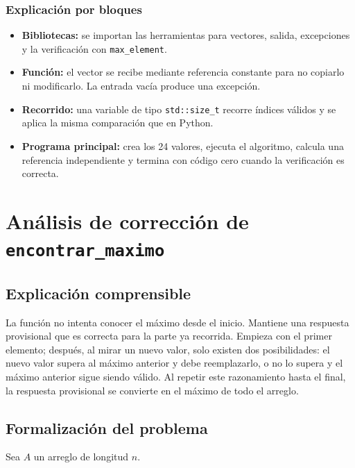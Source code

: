 \documentclass[12pt,letterpaper]{article}
\newcommand{\codigo}[1]{\texttt{#1}}
\begin{document}


\subsubsection{Explicación por bloques}

\begin{itemize}
  \item \textbf{Bibliotecas:} se importan las herramientas para vectores, salida, excepciones y la verificación con \codigo{max\_element}.
  \item \textbf{Función:} el vector se recibe mediante referencia constante para no copiarlo ni modificarlo. La entrada vacía produce una excepción.
  \item \textbf{Recorrido:} una variable de tipo \codigo{std::size\_t} recorre índices válidos y se aplica la misma comparación que en Python.
  \item \textbf{Programa principal:} crea los 24 valores, ejecuta el algoritmo, calcula una referencia independiente y termina con código cero cuando la verificación es correcta.
\end{itemize}

\section{Análisis de corrección de \codigo{encontrar\_maximo}}

\subsection{Explicación comprensible}

La función no intenta conocer el máximo desde el inicio. Mantiene una respuesta provisional que es correcta para la parte ya recorrida. Empieza con el primer elemento; después, al mirar un nuevo valor, solo existen dos posibilidades: el nuevo valor supera al máximo anterior y debe reemplazarlo, o no lo supera y el máximo anterior sigue siendo válido. Al repetir este razonamiento hasta el final, la respuesta provisional se convierte en el máximo de todo el arreglo.

\subsection{Formalización del problema}

Sea $A$ un arreglo de longitud $n$.
\end{document}
